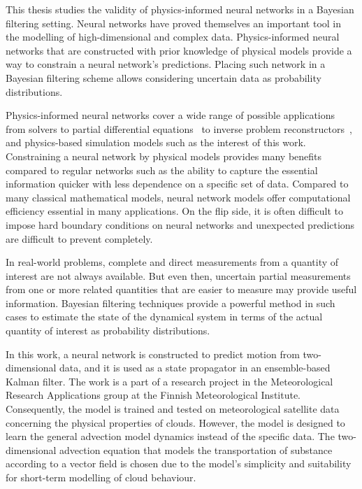 This thesis studies the validity of physics-informed neural networks in a Bayesian filtering setting.
Neural networks have proved themselves an important tool in the modelling of high-dimensional and complex data.
Physics-informed neural networks that are constructed with prior knowledge of physical models provide a way to constrain a neural network's predictions.
Placing such network in a Bayesian filtering scheme allows considering uncertain data as probability distributions.

Physics-informed neural networks cover a wide range of possible applications from solvers to partial differential equations~\cite{pinnpde} to inverse problem reconstructors~\cite{hauptmann}, and physics-based simulation models such as the interest of this work.
Constraining a neural network by physical models provides many benefits compared to regular networks such as the ability to capture the essential information quicker with less dependence on a specific set of data.
Compared to many classical mathematical models, neural network models offer computational efficiency essential in many applications.
On the flip side, it is often difficult to impose hard boundary conditions on neural networks and unexpected predictions are difficult to prevent completely.

In real-world problems, complete and direct measurements from a quantity of interest are not always available.
But even then, uncertain partial measurements from one or more related quantities that are easier to measure may provide useful information.
Bayesian filtering techniques provide a powerful method in such cases to estimate the state of the dynamical system in terms of the actual quantity of interest as probability distributions.  

In this work, a neural network is constructed to predict motion from two-dimensional data, and it is used as a state propagator in an ensemble-based Kalman filter.
The work is a part of a research project in the Meteorological Research Applications group at the Finnish Meteorological Institute.
Consequently, the model is trained and tested on meteorological satellite data concerning the physical properties of clouds.
However, the model is designed to learn the general advection model dynamics instead of the specific data.
The two-dimensional advection equation that models the transportation of substance according to a vector field is chosen due to the model's simplicity and suitability for short-term modelling of cloud behaviour.

